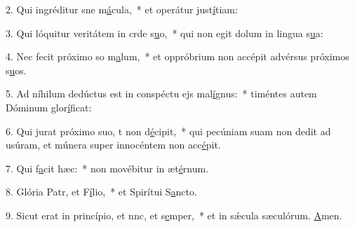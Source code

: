 2. Qui ingréditur sne m\uline{á}cula,~* et operátur just\uline{í}tiam:\par 
3. Qui lóquitur veritátem in crde s\uline{u}o,~* qui non egit dolum in lingua s\uline{u}a:\par 
4. Nec fecit próximo so m\uline{a}lum,~* et oppróbrium non accépit advérsus próximos s\uline{u}os.\par 
5. Ad níhilum dedúctus est in conspéctu ejs mal\uline{í}gnus:~* timéntes autem Dóminum glor\uline{í}ficat:\par 
6. Qui jurat próximo suo, t non d\uline{é}cipit,~* qui pecúniam suam non dedit ad usúram, et múnera super innocéntem non acc\uline{é}pit.\par 
7. Qui f\uline{a}cit hæc:~* non movébitur in æt\uline{é}rnum.\par 
8. Glória Patr, et F\uline{í}lio,~* et Spirítui S\uline{a}ncto.\par 
9. Sicut erat in princípio, et nnc, et s\uline{e}mper,~* et in sǽcula sæculórum. \uline{A}men.\par 
